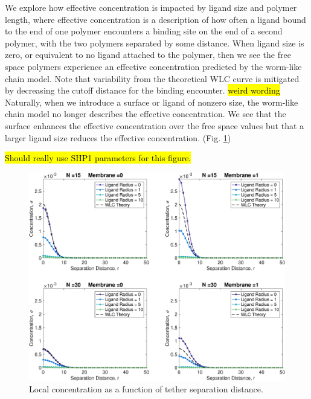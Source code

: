 \documentclass[../../AdvancementSummary.tex]{subfiles}
\begin{document}
We explore how effective concentration is impacted by ligand size and polymer length, where effective concentration is a description of how often a ligand bound to the end of one polymer encounters a binding site on the end of a second polymer, with the two polymers separated by some distance. When ligand size is zero, or equivalent to no ligand attached to the polymer, then we see the free space polymers experience an effective concentration predicted by the worm-like chain model. Note that variability from the theoretical WLC curve is mitigated by decreasing the cutoff distance for the binding encounter. \hl{weird wording} Naturally, when we introduce a surface or ligand of nonzero size, the worm-like chain model no longer describes the effective concentration.  We see that the surface enhances the effective concentration over the free space values but that a larger ligand size reduces the effective concentration. (Fig. \ref{fig: ConcVSSeparation})

\hl{Should really use SHP1 parameters for this figure.}
\begin{figure}[H]
    \begin{center}
        		\includegraphics[width=0.8\linewidth]{ResultsFigures/EffectiveConcentrationKernel/ConcentrationVSSeparation.eps}
        \caption{Local concentration as a function of tether separation distance. \label{fig: ConcVSSeparation}}
    \end{center}
\end{figure}

\end{document}

